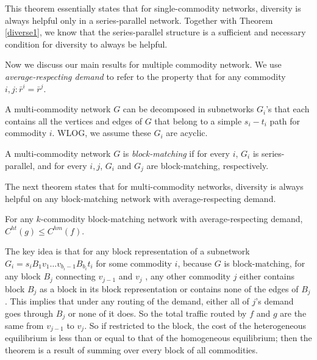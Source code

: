 This theorem essentially states that for single-commodity networks, diversity is always helpful only in a series-parallel network. Together with Theorem \ref{diverse1}, we know that the series-parallel structure is a sufficient and necessary condition for diversity to always be helpful.

Now we discuss our main results for multiple commodity network. We use {\it average-respecting demand} to refer to the property that for any commodity $i,j: \bar{r}^i=\bar{r}^j$. 

A multi-commodity network $G$ can be decomposed in subnetworks $G_i$'s that each contains all the vertices and edges of $G$ that belong to a simple $s_i-t_i$ path for commodity $i$. WLOG, we assume these $G_i$ are acyclic.

\begin{definition}
A multi-commodity network $G$ is {\it block-matching} if for every $i$, $G_i$ is series-parallel, and for every $i, j$, $G_i$ and $G_j$ are block-matching, respectively.
\end{definition}

The next theorem states that for multi-commodity networks, diversity is always helpful on any block-matching network with average-respecting demand. 

\begin{theorem}
For any $k$-commodity block-matching network with average-respecting demand, $C^{ht}(g)\le C^{hm}(f)$.
\label{diverse2}
\end{theorem}

\begin{proof-sketch}

The key idea is that for any block representation of a subnetwork $G_i=s_i B_1 v_1\dots v_{b_i-1} B _{b_i}t_i$ for some commodity $i$, because $G$ is block-matching, for any block $B_j$ connecting $v_{j-1}$ and $v_j$ , any other commodity $j$ either contains block $B_j$ as a block in its block representation or contains none of the edges of $B_j$. This implies that under any routing of the demand, either all of $j$'s demand goes through $B_j$ or none of it does. So the total traffic routed by $f$ and $g$ are the same from $v_{j-1}$ to $v_j$. So if restricted to the block, the cost of the heterogeneous equilibrium is less than or equal to that of the homogeneous equilibrium; then the theorem is a result of summing over every block of all commodities.
\end{proof-sketch}



